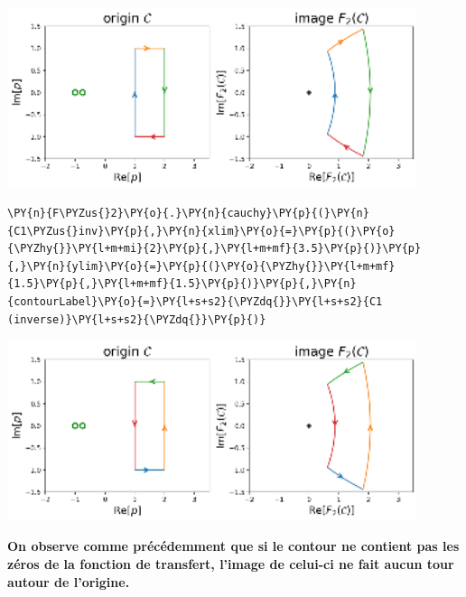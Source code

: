 \begin{center}
    \includegraphics[width=0.9\textwidth]{notebook/fig/output_24_1.eps}
\end{center}
\begin{tcolorbox}[breakable, size=fbox, boxrule=1pt, pad at break*=1mm,colback=cellbackground, colframe=cellborder]
\begin{Verbatim}[commandchars=\\\{\}]
\PY{n}{F\PYZus{}2}\PY{o}{.}\PY{n}{cauchy}\PY{p}{(}\PY{n}{C1\PYZus{}inv}\PY{p}{,}\PY{n}{xlim}\PY{o}{=}\PY{p}{(}\PY{o}{\PYZhy{}}\PY{l+m+mi}{2}\PY{p}{,}\PY{l+m+mf}{3.5}\PY{p}{)}\PY{p}{,}\PY{n}{ylim}\PY{o}{=}\PY{p}{(}\PY{o}{\PYZhy{}}\PY{l+m+mf}{1.5}\PY{p}{,}\PY{l+m+mf}{1.5}\PY{p}{)}\PY{p}{,}\PY{n}{contourLabel}\PY{o}{=}\PY{l+s+s2}{\PYZdq{}}\PY{l+s+s2}{C1 (inverse)}\PY{l+s+s2}{\PYZdq{}}\PY{p}{)}
\end{Verbatim}
\end{tcolorbox}
\begin{center}
    \includegraphics[width=0.9\textwidth]{notebook/fig/output_25_1.eps}
\end{center}
\textbf{On observe comme précédemment que si le contour ne contient pas
les zéros de la fonction de transfert, l'image de celui-ci ne fait aucun
tour autour de l'origine.} 
